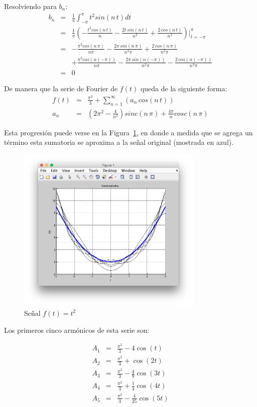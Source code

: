 \documentclass[twocolumn]{article}
\begin{document}
Resolviendo para $b_n$:
\begin{eqnarray*}
b_n &=& \frac{1}{\pi}\int_{-\pi}^{\pi}t^2sin(n\,t)dt\\
&=& \frac{1}{\pi} \left(-\frac{t^2cos(n\,t)}{n} - \frac{2t\,sin(n\,t)}{n^2} + \frac{2\,cos(n\,t)}{n^3}\right)\bigg|_{t=-\pi}^{\pi}\\
&=& -\frac{\pi^2cos(n\,\pi)}{n\pi} - \frac{2\pi\,sin(n\,\pi)}{n^2\pi} + \frac{2\,cos(n\,\pi)}{n^3\pi}\\
& &+ \frac{\pi^2cos(n(-\pi))}{n\pi} - \frac{2\pi\,sin(n(-\pi))}{n^2\pi} - \frac{2\,cos(n(-\pi))}{n^3\pi}\\
&=& 0
\end{eqnarray*}

De manera que la serie de Fourier de $f(t)$ queda de la siguiente forma:
\begin{eqnarray*}
f(t) &=& \frac{\pi^2}{3} + \sum_{n=1}^\infty\left(a_n\,cos(n\,t)\right)\\
a_n &=& \left(2\pi^2  - \frac{4}{n^2} \right) sinc(n\,\pi) + \frac{4\pi}{n}cosc(n\,\pi)
\end{eqnarray*}

Esta progresión puede verse en la Figura~\ref{fig_1}, en donde a medida que se agrega un término esta sumatoria se aproxima a la señal original (mostrada en azul).

\begin{figure}[!t]
\centering
\includegraphics[width=3.5in]{imgs/sqrt.png}
\caption{Señal $f(t) = t^2$}
\label{fig_1}
\end{figure}

Los primeros cinco armónicos de esta serie son:

\begin{eqnarray*}
A_1 &=& \frac{\pi^2}{3} - 4\cos{(t)} \\
A_2 &=& \frac{\pi^2}{3} + \cos{(2t)} \\
A_3 &=& \frac{\pi^2}{3} - \frac{4}{9}\cos{(3t)} \\
A_4 &=& \frac{\pi^2}{3} + \frac{1}{4}\cos{(4t)} \\
A_5 &=& \frac{\pi^2}{3} - \frac{4}{25}\cos{(5t)}
\end{eqnarray*}
\end{document}
